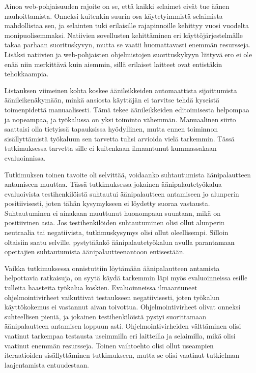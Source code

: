 \documentclass[utf8]{gradu3}
\begin{document}
Ainoa web-pohjaisuuden rajoite on se, että kaikki selaimet eivät tue äänen nauhoittamista. Onneksi kuitenkin suurin osa käytetyimmistä selaimista mahdollistaa sen, ja selainten tuki erilaisille rajapinnoille kehittyy vuosi vuodelta monipuolisemmaksi. Natiivien sovellusten kehittäminen eri käyttöjärjestelmälle takaa parhaan suorituskyvyn, mutta se vaatii huomattavasti enemmän resursseja. Lisäksi natiivien ja web-pohjaisten ohjelmistojen suorituskykyyn liittyvä ero ei ole enää niin merkittävä kuin aiemmin, sillä erilaiset laitteet ovat entistäkin tehokkaampia.

Listauksen viimeinen kohta koskee äänileikkeiden automaattista sijoittumista äänileikenäkymään, minkä ansiosta käyttäjän ei tarvitse tehdä kyseistä toimenpidettä manuaalisesti. Tämä tekee äänileikkeiden editoimisesta helpompaa ja nopeampaa, ja työkalussa on yksi toiminto vähemmän. Manuaalinen siirto saattaisi olla tietyissä tapauksissa hyödyllinen, mutta ennen toiminnon sisällyttämistä työkaluun sen tarvetta tulisi arvioida vielä tarkemmin. Tässä tutkimuksessa tarvetta sille ei kuitenkaan ilmaantunut kummassakaan evaluoinnissa.

Tutkimuksen toinen tavoite oli selvittää, voidaanko suhtautumista äänipalautteen antamiseen muuttaa. Tässä tutkimuksessa jokainen äänipalautetyökalua evaluoivista testihenkilöistä suhtautui äänipalautteen antamiseen jo alunperin positiivisesti, joten tähän kysymykseen ei löydetty suoraa vastausta. Suhtautuminen ei ainakaan muuttunut huonompaan suuntaan, mikä on positiivinen asia. Jos testihenkilöiden suhtautuminen olisi ollut alunperin neutraalia tai negatiivista, tutkimuskysymys olisi ollut oleellisempi. Silloin oltaisiin saatu selville, pystytäänkö äänipalautetyökalun avulla parantamaan opettajien suhtautumista äänipalautteenantoon entisestään. 

Vaikka tutkimuksessa onnistuttiin löytämään äänipalautteen antamista helpottavia ratkaisuja, on syytä käydä tarkemmin läpi myös evaluoinneissa esille tulleita haasteita työkalua koskien.  Evaluoinneissa ilmaantuneet ohjelmointivirheet vaikuttivat testaukseen negatiivisesti, joten työkalun käyttökokemus ei vastannut aivan toivottua. Ohjelmointivirheet olivat onneksi suhteellisen pieniä, ja jokainen testihenkilöistä pystyi suorittamaan äänipalautteen antamisen loppuun asti. Ohjelmointivirheiden välttäminen olisi vaatinut tarkempaa testausta useimmilla eri laitteilla ja selaimilla, mikä olisi vaatinut enemmän resursseja. Toinen vaihtoehto olisi ollut useampien iteraatioiden sisällyttäminen tutkimukseen, mutta se olisi vaatinut tutkielman laajentamista entuudestaan.
\end{document}
